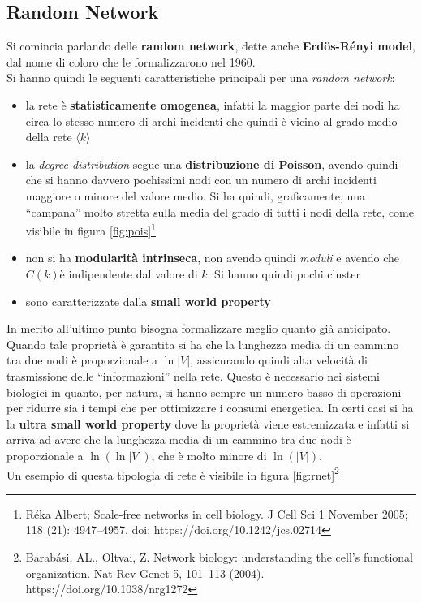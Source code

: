 \documentclass[a4paper,12pt, oneside]{book}
\begin{document}
\subsection{Random Network}
Si comincia parlando delle \textbf{random network}, dette anche
\textbf{Erd\"{o}s-Rényi model}, dal nome di coloro che le formalizzarono nel
1960.\\
Si hanno quindi le seguenti caratteristiche principali per una \textit{random
  network}: 
\begin{itemize}
  \item la rete è \textbf{statisticamente omogenea}, infatti la maggior parte
  dei nodi ha circa lo stesso numero di archi incidenti che quindi è vicino al
  grado medio della rete $\langle k \rangle$
  \item la \textit{degree distribution} segue una \textbf{distribuzione di
    Poisson}, avendo quindi che si hanno davvero pochissimi nodi con un numero
  di archi incidenti maggiore o minore del valore medio. Si ha quindi,
  graficamente, una ``campana'' molto stretta sulla media del grado di tutti i
  nodi della rete,
  come visibile in figura \ref{fig:pois}\footnote{Réka Albert; Scale-free
    networks in cell biology. J Cell Sci 1 November 2005; 118 (21):
    4947–4957. doi: https://doi.org/10.1242/jcs.02714} 
  \item non si ha \textbf{modularità intrinseca}, non avendo quindi
  \textit{moduli} e avendo che $C(k)$è indipendente dal valore di $k$. Si hanno
  quindi pochi cluster
  \item sono caratterizzate dalla \textbf{small world property}
\end{itemize}
In merito all'ultimo punto bisogna formalizzare meglio quanto già
anticipato. Quando tale proprietà è garantita si ha che la lunghezza media di
un cammino tra due nodi è proporzionale a $\ln |V|$, assicurando quindi alta
velocità di trasmissione delle ``informazioni'' nella rete. Questo è necessario
nei sistemi biologici in quanto, per natura, si hanno sempre un numero basso di
operazioni per ridurre sia i tempi che per ottimizzare i consumi energetica. In
certi casi si ha la \textbf{ultra small world property} dove la proprietà viene
estremizzata e infatti si arriva ad avere che la lunghezza media di
un cammino tra due nodi è proporzionale a $\ln(\ln |V|)$, che è molto minore
di $\ln(|V|)$.\\
Un esempio di questa tipologia di rete è visibile in figura
\ref{fig:rnet}\footnote{Barabási, AL., Oltvai, Z. Network biology: understanding
  the cell's functional organization. Nat Rev Genet 5, 101–113
  (2004). https://doi.org/10.1038/nrg1272} 
\end{document}
